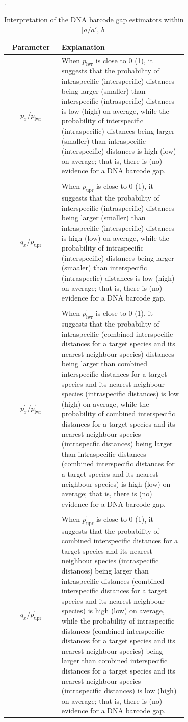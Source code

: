 \documentclass[12pt]{article}
\begin{document}
\begin{table}[htbp]
    \centering
    \small
    \caption{Interpretation of the DNA barcode gap estimators within [$a/a'$, $b$]}.
    \label{tab:parameters}
    \begin{tabular}{cp{0.7\linewidth}}
    \hline
    \textbf{Parameter} & \textbf{Explanation} \\
    \hline
    $p_x$/$p_{\text{lwr}}$ & When $p_{\text{lwr}}$ is close to 0 (1), it suggests that the probability of intraspecific (interspecific) distances being larger (smaller) than interspecific (intraspecific) distances is low (high) on average, while the probability of interspecific (intraspecific) distances being larger (smaller)  than intraspecific (interspecific) distances is high (low) on average; that is, there is (no) evidence for a DNA barcode gap.\\
        & \\[-2mm]
     $q_x$/$p_{\text{upr}}$ & When $p_{\text{upr}}$ is close to 0 (1), it suggests that the probability of interspecific (intraspecific) distances being larger (smaller) than intraspecific (interspecific) distances is high (low) on average, while the probability of intraspecific (interspecific) distances being larger (smaaler) than interspecific (intraspecfic) distances is low (high) on average; that is, there is (no) evidence for a DNA barcode gap. \\
        & \\[-2mm]
    $p^{'}_x$/$p^{'}_{\text{lwr}}$ & When $p^{'}_{\text{lwr}}$ is close to 0 (1), it suggests that the probability of intraspecific (combined interspecific distances for a target species and its nearest neighbour species) distances being larger than combined interspecific distances for a target species and its nearest neighbour species (intraspecific distances) is low (high) on average, while the probability of combined interspecific distances for a target species and its nearest neighbour species (intraspecfic distances) being larger than intraspecific distances (combined interspecific distances for a target species and its nearest neighbour species) is high (low) on average; that is, there is (no) evidence for a DNA barcode gap.\\
        & \\[-2mm]
     $q^{'}_x$/$p^{'}_{\text{upr}}$ & When $p^{'}_{\text{upr}}$ is close to 0 (1), it suggests that the probability of combined interspecific distances for a target species and its nearest neighbour species (intraspecific distances) being larger than intraspecific distances (combined interspecific distances for a target species and its nearest neighbour species) is high (low) on average, while the probability of intraspecific distances (combined interspecific distances for a target species and its nearest neighbour species) being larger than combined interspecific distances for a target species and its nearest neighbour species (intraspecific distances) is low (high) on average; that is, there is (no) evidence for a DNA barcode gap.\\
    \hline
    \end{tabular}
\end{table}
\end{document}
